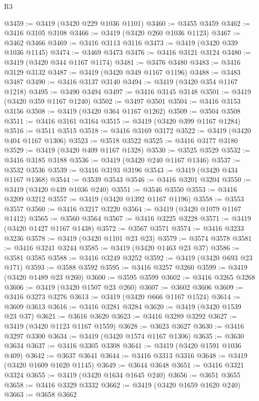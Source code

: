 \begin{lexlean}{R3}
\begin{coremodule}
@3459 := @3419 (@3420 @229 @1036 @1101)
@3460 := @3455 @3459
@3462 := @3416 @3105 @3108
@3466 := @3419 (@3420 @260 @1036 @1123)
@3467 := @3462 @3466
@3469 := @3416 @3113 @3116
@3473 := @3419 (@3420 @339 @1036 @1145)
@3474 := @3469 @3473
@3476 := @3416 @3121 @3124
@3480 := @3419 (@3420 @344 @1167 @1174)
@3481 := @3476 @3480
@3483 := @3416 @3129 @3132
@3487 := @3419 (@3420 @349 @1167 @1196)
@3488 := @3483 @3487
@3490 := @3416 @3137 @3140
@3494 := @3419 (@3420 @354 @1167 @1218)
@3495 := @3490 @3494
@3497 := @3416 @3145 @3148
@3501 := @3419 (@3420 @359 @1167 @1240)
@3502 := @3497 @3501
@3504 := @3416 @3153 @3156
@3508 := @3419 (@3420 @364 @1167 @1262)
@3509 := @3504 @3508
@3511 := @3416 @3161 @3164
@3515 := @3419 (@3420 @399 @1167 @1284)
@3516 := @3511 @3515
@3518 := @3416 @3169 @3172
@3522 := @3419 (@3420 @404 @1167 @1306)
@3523 := @3518 @3522
@3525 := @3416 @3177 @3180
@3529 := @3419 (@3420 @409 @1167 @1328)
@3530 := @3525 @3529
@3532 := @3416 @3185 @3188
@3536 := @3419 (@3420 @240 @1167 @1346)
@3537 := @3532 @3536
@3539 := @3416 @3193 @3196
@3543 := @3419 (@3420 @434 @1167 @1368)
@3544 := @3539 @3543
@3546 := @3416 @3201 @3204
@3550 := @3419 (@3420 @439 @1036 @240)
@3551 := @3546 @3550
@3553 := @3416 @3209 @3212
@3557 := @3419 (@3420 @1392 @1167 @1196)
@3558 := @3553 @3557
@3560 := @3416 @3217 @3220
@3564 := @3419 (@3420 @1079 @1167 @1412)
@3565 := @3560 @3564
@3567 := @3416 @3225 @3228
@3571 := @3419 (@3420 @1427 @1167 @1438)
@3572 := @3567 @3571
@3574 := @3416 @3233 @3236
@3578 := @3419 (@3420 @1101 @23 @23)
@3579 := @3574 @3578
@3581 := @3416 @3241 @3244
@3585 := @3419 (@3420 @1463 @23 @37)
@3586 := @3581 @3585
@3588 := @3416 @3249 @3252
@3592 := @3419 (@3420 @693 @23 @171)
@3593 := @3588 @3592
@3595 := @3416 @3257 @3260
@3599 := @3419 (@3420 @1489 @23 @260)
@3600 := @3595 @3599
@3602 := @3416 @3265 @3268
@3606 := @3419 (@3420 @1507 @23 @260)
@3607 := @3602 @3606
@3609 := @3416 @3273 @3276
@3613 := @3419 (@3420 @666 @1167 @1524)
@3614 := @3609 @3613
@3616 := @3416 @3281 @3284
@3620 := @3419 (@3420 @1539 @23 @37)
@3621 := @3616 @3620
@3623 := @3416 @3289 @3292
@3627 := @3419 (@3420 @1123 @1167 @1559)
@3628 := @3623 @3627
@3630 := @3416 @3297 @3300
@3634 := @3419 (@3420 @1574 @1167 @1306)
@3635 := @3630 @3634
@3637 := @3416 @3305 @3308
@3641 := @3419 (@3420 @1591 @1036 @409)
@3642 := @3637 @3641
@3644 := @3416 @3313 @3316
@3648 := @3419 (@3420 @1609 @1620 @1145)
@3649 := @3644 @3648
@3651 := @3416 @3321 @3324
@3655 := @3419 (@3420 @1634 @1645 @240)
@3656 := @3651 @3655
@3658 := @3416 @3329 @3332
@3662 := @3419 (@3420 @1659 @1620 @240)
@3663 := @3658 @3662

\end{coremodule}
\end{lexlean}
